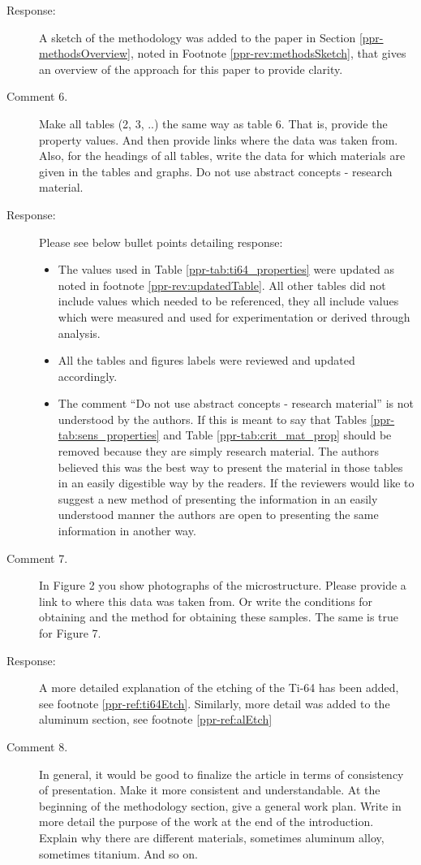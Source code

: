 \documentclass{article}
\begin{document}
\begin{description}
	\item[Response:] A sketch of the methodology  was added to the paper in Section \ref{ppr-methodsOverview}, noted in Footnote \ref{ppr-rev:methodsSketch}, that gives an overview of the approach for this paper to provide clarity.
	\item[Comment 6.] Make all tables (2, 3, ..) the same way as table 6. That is, provide the property values. And then provide links where the data was taken from. Also, for the headings of all tables, write the data for which materials are given in the tables and graphs. Do not use abstract concepts - research material.
	\item[Response:] Please see below bullet points detailing response:
		\begin{itemize}
			\item The values used in Table \ref{ppr-tab:ti64_properties} were updated as noted in footnote \ref{ppr-rev:updatedTable}.  All other tables did not include values which needed to be referenced, they all include values which were measured and used for experimentation or derived through analysis.  
			\item All the tables and figures labels were reviewed and updated accordingly.  
			\item The comment ``Do not use abstract concepts - research material'' is not understood by the authors.  If this is meant to say that Tables \ref{ppr-tab:sens_properties} and Table \ref{ppr-tab:crit_mat_prop} should be removed because they are simply research material.  The authors believed this was the best way to present the material in those tables in an easily digestible way by the readers.  If the reviewers would like to suggest a new method of presenting the information in an easily understood manner the authors are open to presenting the same information in another way.
		\end{itemize}
	\item[Comment 7.] In Figure 2 you show photographs of the microstructure. Please provide a link to where this data was taken from. Or write the conditions for obtaining and the method for obtaining these samples. The same is true for Figure 7.
	\item[Response:] A more detailed explanation of the etching of the Ti-64 has been added, see footnote \ref{ppr-ref:ti64Etch}.  Similarly, more detail was added to the aluminum section, see footnote \ref{ppr-ref:alEtch}
	\item[Comment 8.] In general, it would be good to finalize the article in terms of consistency of presentation. Make it more consistent and understandable. At the beginning of the methodology section, give a general work plan. Write in more detail the purpose of the work at the end of the introduction. Explain why there are different materials, sometimes aluminum alloy, sometimes titanium. And so on.

\end{description}
\end{document}
